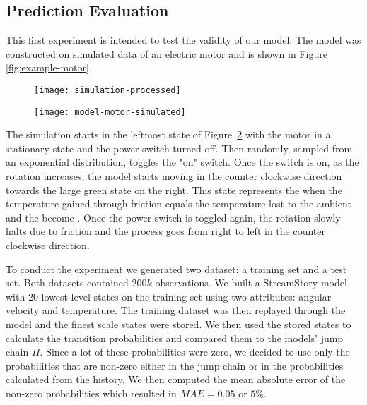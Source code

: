 \subsection{Prediction Evaluation}

This first experiment is intended to test the validity of our model. The model was constructed on simulated data of 
an electric motor and is shown in Figure \ref{fig:example-motor}. 
\begin{figure*}[]
  	\centering
  	\begin{subfigure}{.48\textwidth}
	  	\centering
	  	\texttt{[image: simulation-processed]}
  		\caption{\label{fig:simulation-chart}}
	\end{subfigure}
  	\begin{subfigure}{.48\textwidth}
	  	\centering
	  	\texttt{[image: model-motor-simulated]}
  		\caption{\label{fig:simulation-model}}
	\end{subfigure}
  	\caption{}
  	\label{fig:example-motor}
\end{figure*}
The simulation starts in the leftmost state of Figure~\ref{fig:simulation-model} with the motor in a stationary state
and the power switch turned off. Then  randomly, sampled from an exponential distribution,
toggles the "on" switch. Once the switch is on, as the rotation increases, the model starts moving in the counter clockwise
direction towards the large green state on the right. This state represents the  when the temperature
gained through friction equals the temperature lost to the ambient and the  become .
Once the power switch is toggled again, the rotation slowly halts due to friction and the process goes from right to
left in the counter clockwise direction.

To conduct the experiment we generated two dataset: a training set and a test set. Both datasets
contained $200k$ observations. We built a StreamStory model with 20 lowest-level states on the training set using two attributes:
angular velocity and temperature. The training dataset was then replayed through the model and the finest scale states were stored. We then used
the stored states to calculate the transition probabilities and compared them to the models' jump chain $\Pi$. Since a lot of these probabilities were zero, we decided to use only the probabilities that
are non-zero either in the jump chain or in the probabilities calculated from the history. We then
computed the mean absolute error of the non-zero probabilities which resulted in $MAE=0.05$ or $5\%$.


